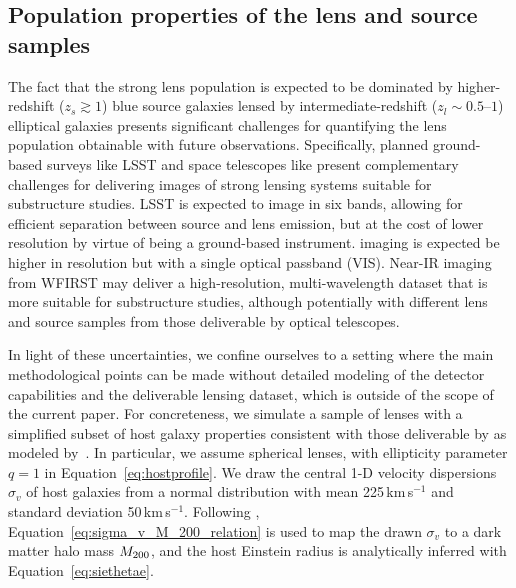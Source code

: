 \documentclass[twocolumn]{aastex63}
\begin{document}
\subsection{Population properties of the lens and source samples}
\label{sec:populations}

The fact that the strong lens population is expected to be dominated by higher-redshift ($z_s \gtrsim1$) blue source galaxies lensed by intermediate-redshift ($z_l \sim 0.5$--$1$) elliptical galaxies presents significant challenges for quantifying the lens population obtainable with future observations. Specifically, planned ground-based surveys like LSST and space telescopes like \Euclid present complementary challenges for delivering images of strong lensing systems suitable for substructure studies. LSST is expected to image in six bands, allowing for efficient separation between source and lens emission, but at the cost of lower resolution by virtue of being a ground-based instrument. \Euclid imaging is expected be higher in resolution but with a single optical passband (VIS). Near-IR imaging from WFIRST may deliver a high-resolution, multi-wavelength dataset that is more suitable for substructure studies, although potentially with different lens and source samples from those deliverable by optical telescopes.

In light of these uncertainties, we confine ourselves to a setting where the main methodological points can be made without detailed modeling of the detector capabilities and the deliverable lensing dataset, which is outside of the scope of the current paper. For concreteness, we simulate a sample of lenses with a simplified subset of host galaxy properties consistent with those deliverable by \Euclid as modeled by~\citet{2015ApJ...811...20C}. In particular, we assume spherical lenses, with ellipticity parameter $q=1$ in Equation~\eqref{eq:hostprofile}. We draw the central 1-D velocity dispersions $\sigma_v$ of host galaxies from a normal distribution with mean 225\,km\,s$^{-1}$ and standard deviation 50\,km\,s$^{-1}$. Following \citet{2018ApJ...859...96Z}, Equation~\eqref{eq:sigma_v_M_200_relation} is used to map the drawn $\sigma_v$ to a dark matter halo mass $M_{200}$, and the host Einstein radius is analytically inferred with Equation~\eqref{eq:siethetae}.
\end{document}
